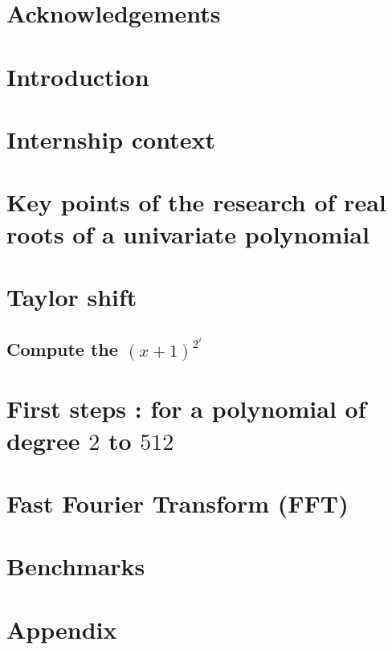 \documentclass[10pt]{report}
\begin{document}

\newpage
\section*{Acknowledgements}


\renewcommand{\contentsname}{Contents}
\renewcommand{\bibname}{References}
\tableofcontents




\section*{Introduction}
\newpage

\section{Internship context}


\newpage
\section{Key points of the research of real roots of a univariate polynomial}



\newpage
\section{Taylor shift}


\subsection{Compute the $(x+1)^{2^i}$}


\newpage
\section{First steps : for a polynomial of degree $2$ to $512$}


\newpage
\section{Fast Fourier Transform (FFT)}


\newpage
\section{Benchmarks}


\newpage
\section*{Appendix}


\newpage
\nocite{*}


\end{document}
